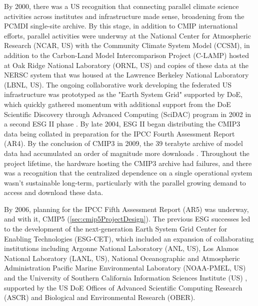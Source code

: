 \documentclass[gmd, preprint]{copernicus}
\begin{document}
By 2000, there was a US recognition that connecting parallel climate science activities across institutes and infrastructure made sense, broadening from the PCMDI single-site archive. By this stage, in addition to CMIP international efforts, parallel activities were underway at the National Center for Atmospheric Research (NCAR, US) with the Community Climate System Model (CCSM), in addition to the Carbon-Land Model Intercomparison Project (C-LAMP) hosted at Oak Ridge National Laboratory (ORNL, US) and copies of these data at the NERSC system that was housed at the Lawrence Berkeley National Laboratory (LBNL, US). The ongoing collaborative work developing the federated US infrastructure was prototyped as the "Earth System Grid" \citep[ESG I;][]{bernholdt_earth_2007} supported by DoE, which quickly gathered momentum with additional support from the DoE Scientific Discovery through Advanced Computing (SciDAC) program in 2002 in a second ESG II phase \citep{williams_earth_2009}. By late 2004, ESG II began distributing the CMIP3 data being collated in preparation for the IPCC Fourth Assessment Report (AR4). By the conclusion of CMIP3 in 2009, the 39 terabyte archive of model data had accumulated an order of magnitude more downloads \citep[420 terabytes;][]{ananthakrishnan_building_2007, williams_earth_2009}. Throughout the project lifetime, the hardware hosting the CMIP3 archive had failures, and there was a recognition that the centralized dependence on a single operational system wasn't sustainable long-term, particularly with the parallel growing demand to access and download these data.

By 2006, planning for the IPCC Fifth Assessment Report (AR5) was underway, and with it, CMIP5 (\autoref{sec:cmip5ProjectDesign}). The previous ESG successes led to the development of the next-generation Earth System Grid Center for Enabling Technologies (ESG-CET), which included an expansion of collaborating institutions including Argonne National Laboratory (ANL, US), Los Alamos National Laboratory (LANL, US), National Oceanographic and Atmospheric Administration Pacific Marine Environmental Laboratory (NOAA-PMEL, US) and the University of Southern California Information Sciences Institute (US) \citep{ananthakrishnan_building_2007}, supported by the US DoE Offices of Advanced Scientific Computing Research (ASCR) and Biological and Environmental Research (OBER).
\end{document}
